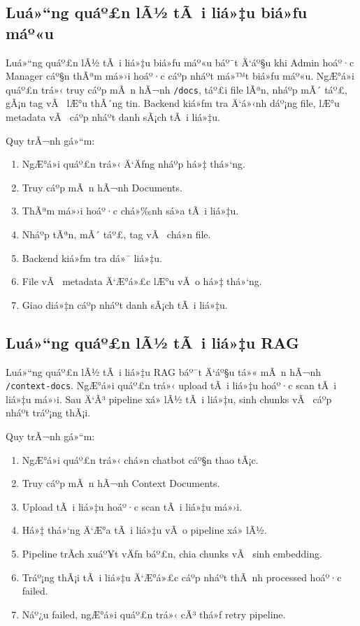 ﻿\documentclass[12pt,a4paper]{report}
\begin{document}
\subsection{Luá»“ng quáº£n lÃ½ tÃ i liá»‡u biá»ƒu máº«u}

Luá»“ng quáº£n lÃ½ tÃ i liá»‡u biá»ƒu máº«u báº¯t Ä‘áº§u khi Admin hoáº·c Manager cáº§n thÃªm má»›i hoáº·c cáº­p nháº­t má»™t biá»ƒu máº«u. NgÆ°á»i quáº£n trá»‹ truy cáº­p mÃ n hÃ¬nh \texttt{/docs}, táº£i file lÃªn, nháº­p mÃ´ táº£, gÃ¡n tag vÃ  lÆ°u thÃ´ng tin. Backend kiá»ƒm tra Ä‘á»‹nh dáº¡ng file, lÆ°u metadata vÃ  cáº­p nháº­t danh sÃ¡ch tÃ i liá»‡u.

Quy trÃ¬nh gá»“m:

\begin{enumerate}
    \item NgÆ°á»i quáº£n trá»‹ Ä‘Äƒng nháº­p há»‡ thá»‘ng.
    \item Truy cáº­p mÃ n hÃ¬nh Documents.
    \item ThÃªm má»›i hoáº·c chá»‰nh sá»­a tÃ i liá»‡u.
    \item Nháº­p tÃªn, mÃ´ táº£, tag vÃ  chá»n file.
    \item Backend kiá»ƒm tra dá»¯ liá»‡u.
    \item File vÃ  metadata Ä‘Æ°á»£c lÆ°u vÃ o há»‡ thá»‘ng.
    \item Giao diá»‡n cáº­p nháº­t danh sÃ¡ch tÃ i liá»‡u.
\end{enumerate}

\subsection{Luá»“ng quáº£n lÃ½ tÃ i liá»‡u RAG}

Luá»“ng quáº£n lÃ½ tÃ i liá»‡u RAG báº¯t Ä‘áº§u tá»« mÃ n hÃ¬nh \texttt{/context-docs}. NgÆ°á»i quáº£n trá»‹ upload tÃ i liá»‡u hoáº·c scan tÃ i liá»‡u má»›i. Sau Ä‘Ã³ pipeline xá»­ lÃ½ tÃ i liá»‡u, sinh chunks vÃ  cáº­p nháº­t tráº¡ng thÃ¡i.

Quy trÃ¬nh gá»“m:

\begin{enumerate}
    \item NgÆ°á»i quáº£n trá»‹ chá»n chatbot cáº§n thao tÃ¡c.
    \item Truy cáº­p mÃ n hÃ¬nh Context Documents.
    \item Upload tÃ i liá»‡u hoáº·c scan tÃ i liá»‡u má»›i.
    \item Há»‡ thá»‘ng Ä‘Æ°a tÃ i liá»‡u vÃ o pipeline xá»­ lÃ½.
    \item Pipeline trÃ­ch xuáº¥t vÄƒn báº£n, chia chunks vÃ  sinh embedding.
    \item Tráº¡ng thÃ¡i tÃ i liá»‡u Ä‘Æ°á»£c cáº­p nháº­t thÃ nh processed hoáº·c failed.
    \item Náº¿u failed, ngÆ°á»i quáº£n trá»‹ cÃ³ thá»ƒ retry pipeline.
\end{enumerate}
\end{document}
